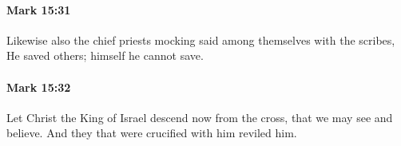 		\paragraph{Mark 15:31} %
			\label{MARK-15-31}

			Likewise also the chief priests mocking said among themselves with the scribes, He saved others; himself he cannot save.

			\begin{framed}
			\scriptsize
				\begin{compactdesc}
					\item[SBLG] 
				\end{compactdesc}
			\end{framed}

		\paragraph{Mark 15:32} %
			\label{MARK-15-32}

			Let Christ the King of Israel descend now from the cross, that we may see and believe. And they that were crucified with him reviled him.

